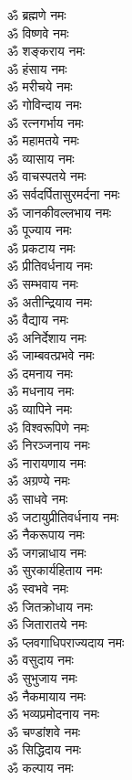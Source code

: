 \begin{multicols}{2}
\begin{flushleft}
ॐ ब्रह्मणे नमः\\
ॐ विष्णवे नमः\hfill{}\\
ॐ शङ्कराय नमः\\
ॐ हंसाय नमः\\
ॐ मरीचये नमः\\
ॐ गोविन्दाय नमः\\
ॐ रत्नगर्भाय नमः\\
ॐ महामतये नमः\\
ॐ व्यासाय नमः\\
ॐ वाचस्पतये नमः\\
ॐ सर्वदर्पितासुरमर्दना नमः\\
ॐ जानकीवल्लभाय नमः\hfill{}\\
ॐ पूज्याय नमः\\
ॐ प्रकटाय नमः\\
ॐ प्रीतिवर्धनाय नमः\\
ॐ सम्भवाय नमः\\
ॐ अतीन्द्रियाय नमः\\
ॐ वैद्याय नमः\\
ॐ अनिर्देशाय नमः\\
ॐ जाम्बवत्प्रभवे नमः\\
ॐ दमनाय नमः\\
ॐ मधनाय नमः\hfill{}\\
ॐ व्यापिने नमः\\
ॐ विश्वरूपिणे नमः\\
ॐ निरञ्जनाय नमः\\
ॐ नारायणाय नमः\\
ॐ अग्रण्ये नमः\\
ॐ साधवे नमः\\
ॐ जटायुप्रीतिवर्धनाय नमः\\
ॐ नैकरूपाय नमः\\
ॐ जगन्नाधाय नमः\\
ॐ सुरकार्यहिताय नमः\hfill{}\\
ॐ स्वभवे नमः\\
ॐ जितक्रोधाय नमः\\
ॐ जितारातये नमः\\
ॐ प्लवगाधिपराज्यदाय नमः\\
ॐ वसुदाय नमः\\
ॐ सुभुजाय नमः\\
ॐ नैकमायाय नमः\\
ॐ भव्यप्रमोदनाय नमः\\
ॐ चण्डांशवे नमः\\
ॐ सिद्धिदाय नमः\hfill{}\\
ॐ कल्पाय नमः\\

\end{flushleft}
\end{multicols}
